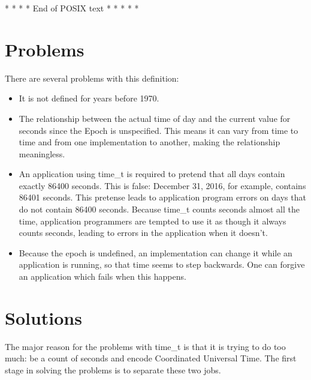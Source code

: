 \documentclass[letterpaper,twoside]{article}
\begin{document}
\begin{center}
  {\large * * * * * End of POSIX text * * * * *}
\end{center}

\section{Problems}
There are several problems with this definition:
\begin{itemize}
\item{It is not defined for years before 1970.}
\item{The relationship between the actual time of day and the current value
  for seconds since the Epoch is unspecified.
  This means it can vary from time to time
  and from one implementation to another, making the
  relationship meaningless.}
\item{An application using {\ttfamily time\_t} is required to pretend that
  all days
  contain exactly \num{86400} seconds.  This is false: December 31, 2016, for
  example, contains \num{86401} seconds.  This pretense leads to application
  program errors on days that do not contain \num{86400} seconds.
  Because {\ttfamily time\_t} counts seconds almost all the time,
  application programmers
  are tempted to use it as though it always counts seconds,
  leading to errors in the application when it doesn't.}
\item{Because the epoch is undefined, an implementation can change
  it while an application is running, so that time seems to step
  backwards.  One can forgive an application which fails when this
  happens.}
\end{itemize}

\section{Solutions}
The major reason for the problems with {\ttfamily time\_t} is that it is
trying to do
too much: be a count of seconds and encode Coordinated Universal Time.
The first stage in solving the problems is to separate these two jobs.
\end{document}

